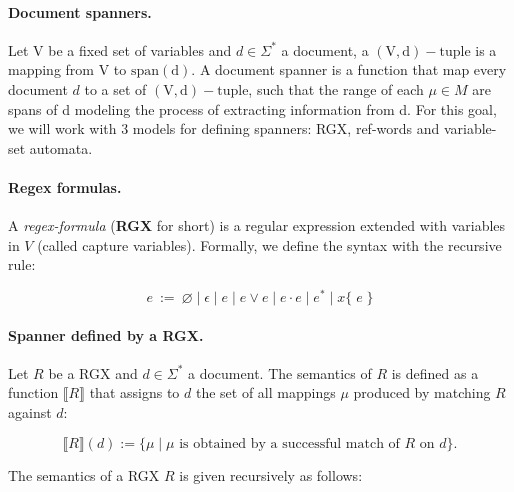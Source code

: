 \documentclass{article}
\begin{document}
\paragraph{Document spanners.} Let V be a fixed set of variables and $d \in \Sigma^*$ a document, a $\operatorname{(V,d)-tuple}$ is a mapping from V to $\operatorname{span(d)}$. A document spanner is a function that map every document $d$ to a set of $\operatorname{(V,d)-tuple}$, such that the range of each $\mu \in M$ are spans of d modeling the process of extracting information from d. For this goal, we will work with 3 models for defining spanners: RGX, ref-words and variable-set automata.



\paragraph{Regex formulas.} A \textit{regex-formula} (\textbf{RGX} for short) is a regular expression extended with variables in $V$ (called capture variables). Formally, we define the syntax with the recursive rule:

\[e \ := \ \varnothing \mid \epsilon \mid e \mid e \lor e \mid e \cdot e \mid e^* \mid x\{ \; e \; \}\]
 
\paragraph{Spanner defined by a RGX.}  
Let $R$ be a RGX and $d \in \Sigma^*$ a document.  
The semantics of $R$ is defined as a function 
$\llbracket R \rrbracket$ that assigns 
to $d$ the set of all mappings $\mu$ produced by matching $R$ against $d$:

\[
\llbracket R \rrbracket(d) := 
\{ \mu \mid \mu \text{ is obtained by a successful match of $R$ on $d$} \}.
\]

The semantics of a RGX $R$ is given recursively as follows:
\end{document}

